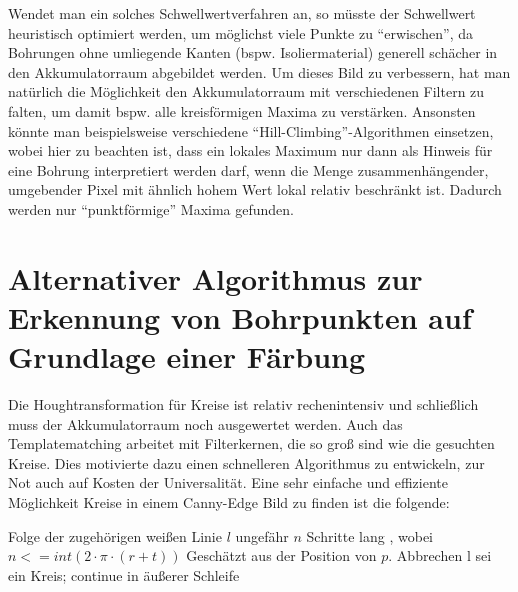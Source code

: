Wendet man ein solches Schwellwertverfahren an, so müsste der Schwellwert heuristisch optimiert werden, um möglichst viele Punkte zu “erwischen”, da Bohrungen ohne umliegende Kanten (bspw. Isoliermaterial) generell schächer in den Akkumulatorraum abgebildet werden. \newline
Um dieses Bild zu verbessern, hat man natürlich die Möglichkeit den Akkumulatorraum mit verschiedenen Filtern zu falten, um damit bspw. alle kreisförmigen Maxima zu verstärken. \newline
Ansonsten könnte man beispielsweise verschiedene “Hill-Climbing”-Algorithmen einsetzen, wobei hier zu beachten ist, dass ein lokales Maximum nur dann als Hinweis für eine Bohrung interpretiert werden darf, wenn die Menge zusammenhängender, umgebender Pixel mit ähnlich hohem Wert lokal relativ beschränkt ist. Dadurch werden nur “punktförmige” Maxima gefunden.

\section{Alternativer Algorithmus zur Erkennung von Bohrpunkten auf Grundlage einer Färbung}
Die Houghtransformation für Kreise ist relativ rechenintensiv und schließlich muss der Akkumulatorraum noch ausgewertet werden. Auch das Templatematching arbeitet mit Filterkernen, die so groß sind wie die gesuchten Kreise. Dies motivierte dazu einen schnelleren Algorithmus zu entwickeln, zur Not auch auf Kosten der Universalität.
Eine sehr einfache und effiziente Möglichkeit Kreise in einem Canny-Edge Bild zu finden ist die folgende:
\newline
\begin{algorithmic}
    \State Folge der zugehörigen weißen Linie $l$ ungefähr $n$ Schritte lang
    \State , wobei $n <= int(2\cdot\pi\cdot(r+t))$
      \Comment Geschätzt aus der Position von $p$.
          \State Abbrechen             
        \EndIf 
          \State l sei ein Kreis; continue in äußerer Schleife            
        \EndIf
      \EndFor
  \EndIf
\EndFor
\EndProcedure \newline
\end{algorithmic}

